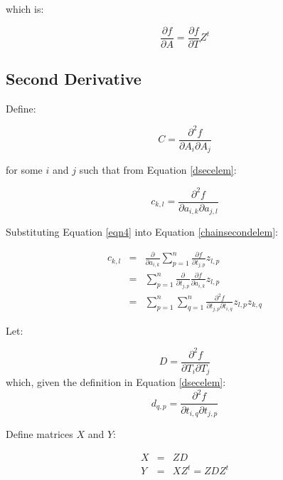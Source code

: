 \documentclass{report}
\begin{document}
\noindent which is:

\begin{equation}
\frac{\partial f}{\partial A} = \frac{\partial f}{\partial T} Z^t
\end{equation}


\subsection{Second Derivative}

Define:

\begin{equation}
C = \frac{\partial^2 f}{\partial A_i \partial A_j}
\end{equation}

\noindent for some $i$ and $j$ such that from Equation \ref{dsecelem}:

\begin{equation}
\label{chainsecondelem}
c_{k,l} = \frac{\partial^2 f}{\partial a_{i,k} \partial a_{j,l}}
\end{equation}

\noindent Substituting Equation \ref{eqn4} into Equation \ref{chainsecondelem}:

\begin{eqnarray}
c_{k,l} &=& \frac{\partial}{\partial a_{i,k}} \sum_{p=1}^n \frac{ \partial f}{\partial t_{j,p}} z_{l,p} \\
        &=& \sum_{p=1}^n \frac{\partial}{\partial t_{j,p}} \frac{\partial f}{\partial a_{i,k}} z_{l,p} \\
\label{chainsecondr1}
        &=& \sum_{p=1}^n \sum_{q=1}^n \frac{\partial^2 f}{ \partial t_{j,p} \partial t_{i,q}} z_{l,p} z_{k,q} 
\end{eqnarray}

\noindent Let:

\begin{equation}
D = \frac{\partial^2 f}{\partial T_i \partial T_j}
\end{equation}
which, given the definition in Equation \ref{dsecelem}:
\begin{equation}
d_{q,p} = \frac{\partial^2 f}{\partial t_{i,q} \partial t_{j,p}}
\end{equation}

\noindent Define matrices $X$ and $Y$:

\begin{eqnarray}
X &=& Z D \\
Y &=& X Z^t = Z D Z^t
\end{eqnarray}
\end{document}
